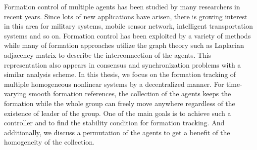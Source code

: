 \documentclass[11pt, a4paper, oneside, openany, reqno]{book}
\theoremstyle{definition}
\theoremstyle{remark}
\numberwithin{equation}{chapter} %
\begin{document}
\begin{EnglishAbstract}
	Formation control of multiple agents has been studied by many researchers in recent years.
	Since lots of new applications have arisen, there is growing interest in this area for
	military systems, mobile sensor network, intelligent transportation systems and so on.
	Formation control has been exploited by a variety of methods 
	while many of formation approaches utilize the graph theory such as 
	Laplacian adjacency matrix to describe the interconnection of the agents.
	This representation also appears in consensus and synchronization problems
	with a similar analysis scheme.
	In this thesis, we focus on the formation tracking of multiple homogeneous nonlinear systems 
	by a decentralized manner. For time-varying smooth formation references, 
	the collection of the agents keeps the formation while the whole group can freely move anywhere
	regardless of the existence of leader of the group.
	One of the main goals is to achieve such a controller and to find the stability condition
	for formation tracking. And additionally, we discuss a permutation of the agents to get a benefit of
	the homogeneity of the collection.
\end{EnglishAbstract}



\pagestyle{fancy}%
\lhead{\leftmark}%
\rhead{}%
\chead{}%
\cfoot{\thepage}%
\renewcommand{\headrulewidth}{0pt}


\tableofcontents
{}
\listoffigures
{}
\end{document}
